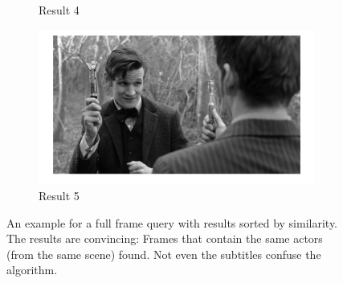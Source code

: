 \documentclass{paper}
\begin{document}
\begin{figure}
\begin{subfigure}[b]{0.32\textwidth}
  	\caption{Result 4}
  \end{subfigure}
  \begin{subfigure}[b]{0.32\textwidth}
  	\includegraphics[width=\textwidth]{full_frame_query_result5}
  	\caption{Result 5}
  \end{subfigure}
  \caption{An example for a full frame query with results sorted by similarity. 
  The results are convincing: Frames that contain
  the same actors (from the same scene) found. Not even the subtitles confuse the algorithm.}
  \label{fig:full_frame_query}
\end{figure}
\end{document}
